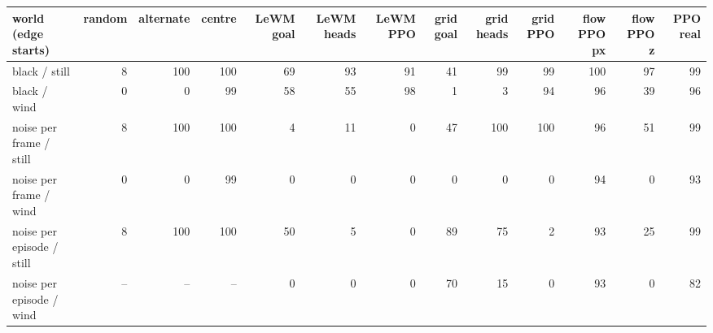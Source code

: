 \begin{tabular}{lrrrrrrrrrrrr}
\toprule
world (edge starts) & random & alternate & centre & LeWM goal & LeWM heads & LeWM PPO & grid goal & grid heads & grid PPO & flow PPO px & flow PPO z & PPO real \\
\midrule
black / still & 8 & 100 & 100 & 69 & 93 & 91 & 41 & 99 & 99 & 100 & 97 & 99 \\
black / wind & 0 & 0 & 99 & 58 & 55 & 98 & 1 & 3 & 94 & 96 & 39 & 96 \\
noise per frame / still & 8 & 100 & 100 & 4 & 11 & 0 & 47 & 100 & 100 & 96 & 51 & 99 \\
noise per frame / wind & 0 & 0 & 99 & 0 & 0 & 0 & 0 & 0 & 0 & 94 & 0 & 93 \\
noise per episode / still & 8 & 100 & 100 & 50 & 5 & 0 & 89 & 75 & 2 & 93 & 25 & 99 \\
noise per episode / wind & -- & -- & -- & 0 & 0 & 0 & 70 & 15 & 0 & 93 & 0 & 82 \\
\bottomrule
\end{tabular}
